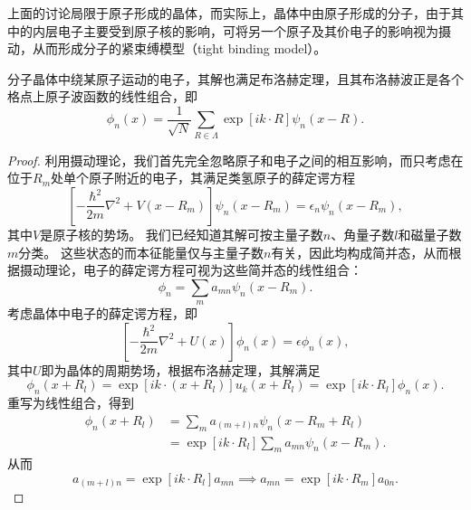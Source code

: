 上面的讨论局限于原子形成的晶体，而实际上，晶体中由原子形成的分子，由于其中的内层电子主要受到原子核的影响，可将另一个原子及其价电子的影响视为摄动，从而形成分子的紧束缚模型（tight binding model）。
\begin{proposition}
    分子晶体中绕某原子运动的电子，其解也满足布洛赫定理，且其布洛赫波正是各个格点上原子波函数的线性组合，即
    \begin{equation}
        \phi_n(x) = \frac{1}{\sqrt N} \sum_{R \in \Lambda} \exp[ik\cdot R] \psi_n(x - R).
    \end{equation}
\end{proposition}
\begin{proof}\small
    利用摄动理论，我们首先完全忽略原子和电子之间的相互影响，而只考虑在位于$R_m$处单个原子附近的电子，其满足类氢原子的薛定谔方程
    \begin{equation}
        \left[- \frac{\hbar^2}{2m} \nabla^2 + V(x - R_m)\right] \psi_n(x - R_m) = \epsilon_n \psi_n(x - R_m),
    \end{equation}
    其中$V$是原子核的势场。
    我们已经知道其解可按主量子数$n$、角量子数$l$和磁量子数$m$分类。
    这些状态的而本征能量仅与主量子数$n$有关，因此均构成简并态，从而根据摄动理论，电子的薛定谔方程可视为这些简并态的线性组合：
    \begin{equation}
        \phi_n = \sum_m a_{mn} \psi_n(x - R_m).
    \end{equation}
    考虑晶体中电子的薛定谔方程，即
    \begin{equation}
        \left[- \frac{\hbar^2}{2m} \nabla^2 + U(x)\right] \phi_n(x) = \epsilon \phi_n(x),
    \end{equation}
    其中$U$即为晶体的周期势场，根据布洛赫定理，其解满足
    \begin{equation}
        \phi_n(x + R_l) = \exp[ik\cdot(x + R_l)] u_k(x + R_l) = \exp[ik \cdot R_l] \phi_n(x).
    \end{equation}
    重写为线性组合，得到
    \begin{equation}
        \begin{aligned}
            \phi_n(x + R_l) &= \sum_m a_{(m+l)n} \psi_n(x - R_m + R_l) \\
            &= \exp[ik \cdot R_l] \sum_m a_{mn} \psi_n(x - R_m).
        \end{aligned}
    \end{equation}
    从而
    \begin{equation}
        a_{(m+l)n} = \exp[ik\cdot R_l] a_{mn} \implies a_{mn} = \exp[ik \cdot R_m] a_{0n}.
    \end{equation}

\end{proof}
